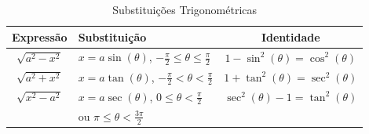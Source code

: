 \begin{table}
  \centering
  \renewcommand*{\arraystretch}{2.2}
  \caption{Substituições Trigonométricas}
  \label{tab:substituicoes_trigonometricas}
  \begin{tabular}{cp{7cm}c}
    \hline
       Expressão     & Substituição                                                       &             Identidade             \\ \hline
    $\sqrt{a^2-x^2}$ & $x=a\sin(\theta)$, $-\frac{\pi}{2} \leq \theta \leq \frac{\pi}{2}$ & $1-\sin^2(\theta)= \cos^2(\theta)$ \\
    $\sqrt{a^2+x^2}$ & $x=a\tan(\theta)$, $-\frac{\pi}{2}< \theta < \frac{\pi}{2}$        & $1+\tan^2(\theta)= \sec^2(\theta)$ \\
    $\sqrt{x^2-a^2}$ & $x=a\sec(\theta)$, $0 \leq \theta < \frac{\pi}{2}$                 &  $\sec^2(\theta)-1=\tan^2(\theta)$ \\
                     & ou $\pi \leq \theta < \frac{3\pi}{2}$                              &                                    \\ \hline
  \end{tabular}
\end{table}

